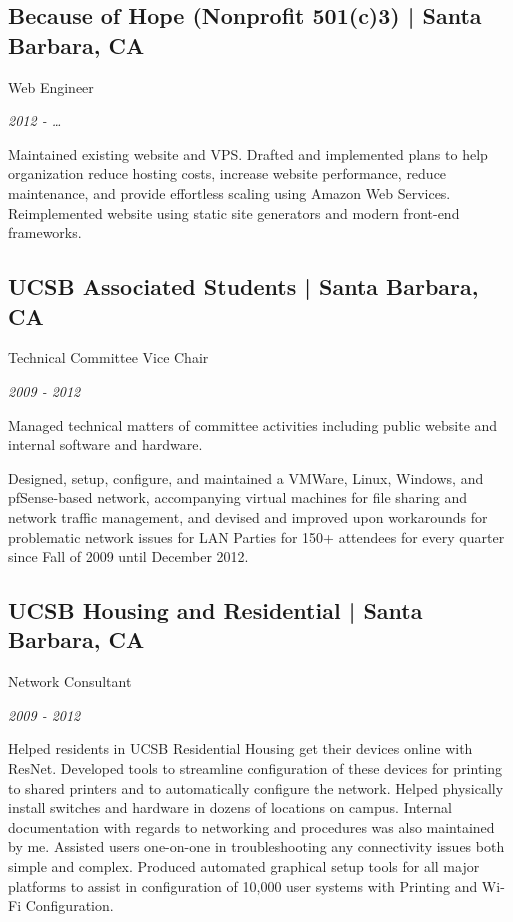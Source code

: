 \documentclass[10pt, letter]{article}
\newcommand{\years}[1]{\marginnote{#1}}
\renewcommand{\years}[1]{{\emph{#1}}}
\begin{document}
\begin{multicols}{2}
\subsection*{Because of Hope (Nonprofit 501(c)3) | {\footnotesize{Santa Barbara, CA}}}

Web Engineer

\years{2012 - \ldots}

Maintained existing website and VPS. Drafted and implemented plans to help
organization reduce hosting costs, increase website performance, reduce
maintenance, and provide effortless scaling using Amazon Web Services.
Reimplemented website using static site generators and modern front-end
frameworks.

\subsection*{UCSB Associated Students | {\footnotesize{Santa Barbara, CA}}}

Technical Committee Vice Chair

\years{2009 - 2012}

Managed technical matters of committee activities including public website
and internal software and hardware.

Designed, setup, configure, and maintained a VMWare, Linux, Windows, and
pfSense-based network, accompanying virtual machines for file sharing and
network traffic management, and devised and improved upon workarounds for
problematic network issues for LAN Parties for 150+ attendees for every
quarter since Fall of 2009 until December 2012.

\subsection*{UCSB Housing and Residential | {\footnotesize{Santa Barbara, CA}}}

Network Consultant

\years{2009 - 2012}

Helped residents in UCSB Residential Housing get their devices online with
ResNet.  Developed tools to streamline configuration of these devices for
printing to shared printers and to automatically configure the network. Helped
physically install switches and hardware in dozens of locations on campus.
Internal documentation with regards to networking and procedures was also
maintained by me. Assisted users one-on-one in troubleshooting any connectivity
issues both simple and complex. Produced automated graphical setup tools for
all major platforms to assist in configuration of 10,000 user systems with
Printing and Wi-Fi Configuration.


\end{multicols}
\end{document}
